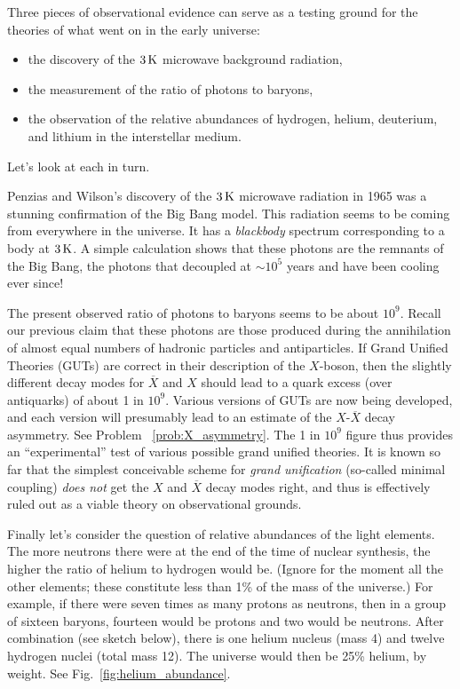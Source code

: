 Three pieces of observational evidence can serve as a testing ground
for the theories of what went on in the early universe:
\begin{itemize}
\item the discovery of the $3\,\mbox{K}$ microwave background radiation,
\item the measurement of the ratio of photons to baryons,
\item the observation of the relative abundances of hydrogen, helium,
  deuterium, and lithium in the interstellar medium.
\end{itemize}
Let's look at each in turn.

Penzias and Wilson's discovery of the $3\,\mbox{K}$ microwave radiation in 1965
was a stunning confirmation of the Big Bang model.  This radiation
seems to be coming from everywhere in the universe.  It has a
{\em blackbody} spectrum corresponding to a body at $3\,\mbox{K}$.  A simple
calculation shows that these photons are the remnants of the Big Bang,
the photons that decoupled at $\sim 10^5$ years and have been cooling ever
since!

The present observed ratio of photons to baryons seems to be about
$10^9$. Recall our previous claim that these photons are those
produced during the annihilation of almost equal numbers of hadronic
particles and antiparticles. If Grand Unified Theories (GUTs) are
correct in their description of the $X$-boson, then the slightly
different decay modes for $\overline X$ and $X$ should lead to a quark
excess (over antiquarks) of about 1 in $10^9$.  Various versions of
GUTs are now being developed, and each version will presumably lead
to an estimate of the $X$-$\overline X$ decay asymmetry.  See
Problem~
\ref{prob:X_asymmetry}.  The 1 in
$10^9$ figure thus provides an ``experimental'' test of various
possible grand unified theories.  It is known so far that the simplest
conceivable scheme for {\em grand unification} (so-called minimal
coupling) {\em does not} get the $X$ and $\overline X$ decay modes
right, and thus is effectively ruled out as a viable theory on
observational grounds.

Finally let's consider the question of relative abundances of the
light elements.  The more neutrons there were at the end of the time
of nuclear synthesis, the higher the ratio of helium to hydrogen would
be. (Ignore for the moment all the other elements; these constitute
less than 1\% of the mass of the universe.)  For example, if there were
seven times as many protons as neutrons, then in a group of sixteen
baryons, fourteen would be protons and two would be neutrons. After
combination (see sketch below), there is one helium nucleus (mass 4)
and twelve hydrogen nuclei (total mass 12).  The universe would then
be 25\% helium, by weight.  See Fig.~\ref{fig:helium_abundance}.

